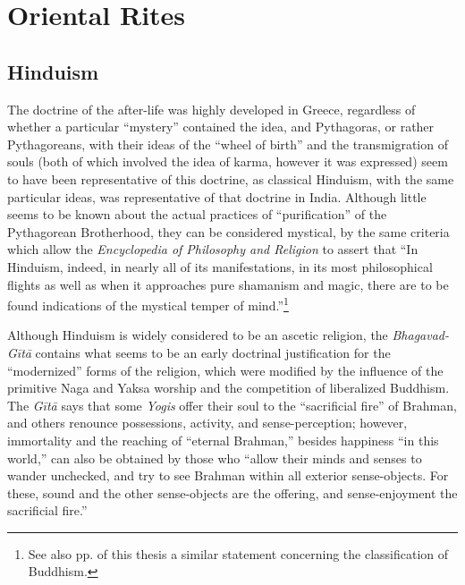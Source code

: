 \section{Oriental Rites}

\subsection{Hinduism}

The doctrine of the after-life was highly developed in
Greece, regardless of whether a particular \enquote{mystery} contained
the idea, and Pythagoras, or rather Pythagoreans, with
their ideas of the \enquote{wheel of birth} and the transmigration of souls\supercite{britannica:encyclopedia}
(both of which involved the idea of karma, however
it was expressed) seem to have been representative of this
doctrine, as classical Hinduism, with the same particular
ideas, was representative of that doctrine in India. Although
little seems to be known about the actual practices
of \enquote{purification} of the Pythagorean Brotherhood, they can
be considered mystical, by the same criteria which allow
the \emph{Encyclopedia of Philosophy and Religion} to assert that
\enquote{In Hinduism, indeed, in nearly all of its manifestations,
in its most philosophical flights as well as when it
approaches pure shamanism and magic, there are to be found
indications of the mystical temper of mind.}\supercite{hastings:philosophy-religion}\footnote{See also pp. \pageref{self:01} of this thesis a similar statement concerning the classification of Buddhism.}

Although Hinduism is widely considered to be an ascetic religion, 
the \emph{Bhagavad-Gītā} contains what seems to be an
early doctrinal justification for the \enquote{modernized} forms of
the religion, which were modified by the influence of the
primitive Naga and Yaksa worship and the competition of
liberalized Buddhism. The \emph{Gītā} says that some \emph{Yogis} offer
their soul to the \enquote{sacrificial fire} of Brahman, and others
renounce possessions, activity, and sense-perception; however,
immortality and the reaching of \enquote{eternal Brahman,}
besides happiness \enquote{in this world,} can also be obtained by
those who \enquote{allow their minds and senses to wander unchecked,
and try to see Brahman within all exterior sense-objects.
For these, sound and the other sense-objects are the offering,
and sense-enjoyment the sacrificial fire.}\supercite{vyasa:bhagavad-gita}

\label{self:17}

